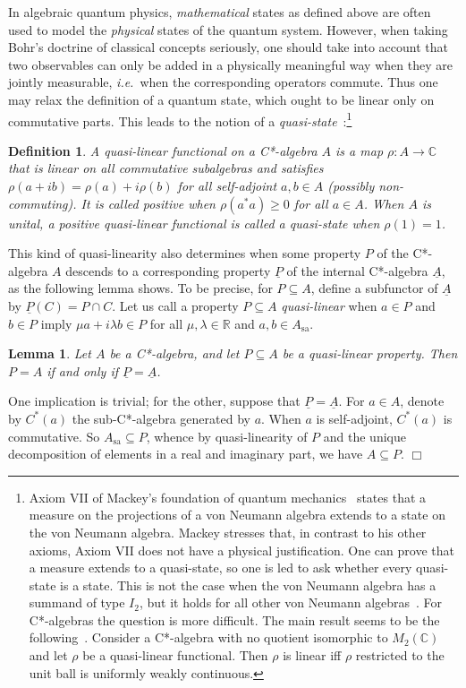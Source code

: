 \documentclass[11pt]{article}
\newcommand{\alg}[1]{\ensuremath{#1}}
\newcommand{\Mtwo}{\ensuremath{M_2}(\field{C})}
\newcommand{\sa}{\ensuremath{_{\mathrm{sa}}}}
\newcommand{\field}[1]{\ensuremath{\mathbb{#1}}}
\newcommand{\uA}{\underline{A}}
\newcommand{\ie}{\textit{i.e.}}
\newtheorem{lemma}[theorem]{Lemma}
\newtheorem{definition}[theorem]{Definition}
\newenvironment{proof}[1][Proof]%
{ \begin{trivlist}%
  \item[\hskip \labelsep {\bfseries #1}]%
}%
{ \end{trivlist}%
}
\newcommand{\qed}{\nobreak\hfill$\Box$}
\begin{document}
In algebraic quantum physics, {\it mathematical} states as defined above are
often used to model
the {\it physical} states of the quantum system. However, when taking Bohr's
doctrine of classical concepts seriously, one should
take into account that two observables can only be added in a physically
meaningful way when they are
jointly measurable, \ie\ when the corresponding operators
commute. Thus one may relax the definition of a quantum state, which
 ought to be linear only on
commutative parts. This leads to the notion of a
{\it quasi-state}~\cite{Aarnes}:\footnote{Axiom VII of Mackey's foundation
  of quantum mechanics~\cite{Mackey}
states that a measure on the projections of a von
Neumann algebra extends to a state on the von Neumann algebra. Mackey stresses
that, in contrast to his other axioms, Axiom VII does not have a physical
justification. One can prove that a measure extends to a quasi-state, so one is
led to ask whether every quasi-state is a state. This is not the
case when the von Neumann algebra has a summand of type $I_2$, but it
holds for all other von Neumann algebras~\cite{BunceWright:vonNeumann}.
For C*-algebras the question is more difficult. The main result
seems to be the following~\cite{BunceWright}. Consider a C*-algebra
with no quotient isomorphic to $\Mtwo$ and let $\rho$ be a
quasi-linear functional. Then $\rho$ is linear iff $\rho$ restricted
to the unit ball is uniformly weakly continuous.}
\begin{definition}
\label{def:quasi-state}
  A \emph{quasi-linear} functional on a C*-algebra $\alg{A}$ is a map
  $\rho:\alg{A}\rightarrow \field{C}$ that is linear on all
  commutative subalgebras and satisfies $\rho(a+ib)=\rho(a)+i\rho(b)$
  for all self-adjoint  $a,b \in \alg{A}$ (possibly non-commuting). It
  is called \emph{positive} when $\rho(a^*a) \geq 0$ for all $a \in
  \alg{A}$. When $\alg{A}$ is unital, a positive quasi-linear
  functional is called a \emph{quasi-state} when $\rho(1)=1$.
\end{definition}

This kind of quasi-linearity also determines when some property $P$
of the C*-algebra $A$ descends to a corresponding property $\underline{P}$ of
the
internal C*-algebra $\uA$, as the following lemma shows. To be precise,
for $P \subseteq A$, define a subfunctor of $\uA$
by $\underline{P}(C) = P \cap C$. Let us call a property $P
\subseteq A$ \emph{quasi-linear} when $a \in P$ and $b \in P$ imply $\mu
a+i\lambda b \in P$ for all $\mu,\lambda \in \field{R}$ and
$a,b \in A\sa$.
\begin{lemma}
\label{cor:propertyonjlbextends}
  Let $A$ be a C*-algebra, and let $P \subseteq A$ be a quasi-linear
  property. Then $P=A$ if and only if $\underline{P} = \uA$.
\end{lemma}
\begin{proof}
  One implication is trivial; for the other, suppose that
  $\underline{P} = \uA$. For $a \in \alg{A}$, denote by $C^*(a)$
  the sub-C*-algebra generated by $a$. When $a$ is self-adjoint,
  $C^*(a)$ is commutative. So $\alg{A}\sa \subseteq P$, whence by
  quasi-linearity of $P$ and the unique decomposition of elements in a
  real and imaginary part, we have $\alg{A} \subseteq P$.
  \qed
\end{proof}
\end{document}
